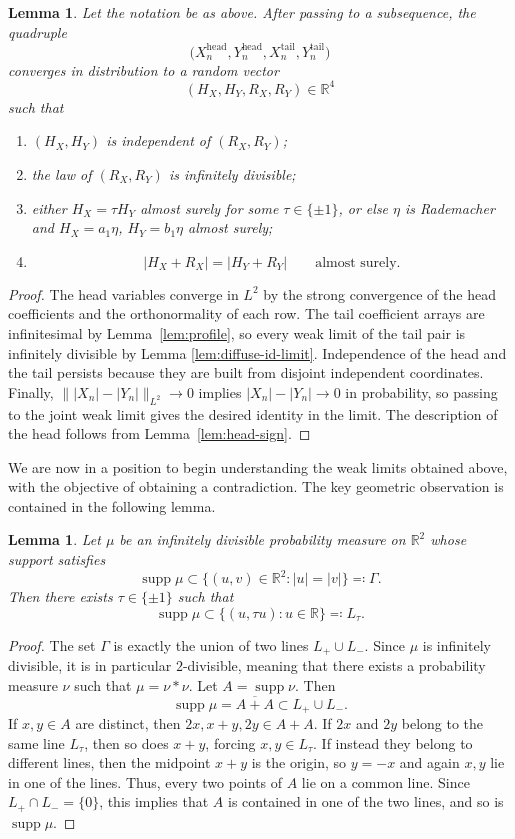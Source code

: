 \documentclass[11pt]{amsart}
\numberwithin{equation}{section}
\newtheorem{lemma}[theorem]{Lemma}
\theoremstyle{definition}
\theoremstyle{remark}
\newcommand{\R}{\mathbb R}
\newcommand{\supp}{\operatorname{supp}}
\newcommand{\abs}[1]{\lvert #1 \rvert}
\newcommand{\norm}[1]{\lVert #1 \rVert}
\begin{document}
\begin{lemma}\label{lem:limit-law}
Let the notation be as above. After passing to a subsequence, the quadruple
\[
\bigl(X_n^{\mathrm{head}},Y_n^{\mathrm{head}},
X_n^{\mathrm{tail}},Y_n^{\mathrm{tail}}\bigr)
\]
converges in distribution to a random vector
\[
(H_X,H_Y,R_X,R_Y)\in\R^4
\]
such that
\begin{enumerate}[label=\rm(\arabic*)]
\item $(H_X,H_Y)$ is independent of $(R_X,R_Y)$;
\item the law of $(R_X,R_Y)$ is infinitely divisible;
\item either $H_X=\tau H_Y$ almost surely for some $\tau\in\{\pm1\}$, or
else $\eta$ is Rademacher and
$H_X=a_1\eta$, $H_Y=b_1\eta$ almost surely;
\item
\[
\abs{H_X+R_X}=\abs{H_Y+R_Y}
\qquad\text{almost surely.}
\]
\end{enumerate}
\end{lemma}

\begin{proof}
The head variables converge in $L^2$ by the strong convergence of the head
coefficients and the orthonormality of each row.  The tail coefficient arrays
are infinitesimal by Lemma~\ref{lem:profile}, so every weak limit of the
tail pair is infinitely divisible by Lemma \ref{lem:diffuse-id-limit}.  Independence of the head and the tail persists
because they are built from disjoint independent coordinates.  Finally,
$\norm{\abs{X_n}-\abs{Y_n}}_{L^2}\to0$ implies
$\abs{X_n}-\abs{Y_n}\to0$ in probability, so passing to the joint weak limit
gives the desired identity in the limit.  The description of the head follows
from Lemma~\ref{lem:head-sign}.
\end{proof}
We are now in a position to begin understanding the weak limits obtained above, with the objective of obtaining a contradiction. The key geometric observation
is contained in the following lemma.
\begin{lemma}\label{lem:id-line}
Let $\mu$ be an infinitely divisible probability measure on $\R^2$ whose support satisfies
\[
\supp\mu\subset\{(u,v)\in\R^2:\abs{u}=\abs{v}\} \eqqcolon \Gamma.
\]
Then there exists $\tau\in\{\pm1\}$ such that
\[
\supp\mu\subset \{(u,\tau u):u\in\R\} \eqqcolon L_\tau.
\]
\end{lemma}

\begin{proof}
The set $\Gamma$ is exactly the union of two lines $L_+\cup L_-$.  Since $\mu$ is
infinitely divisible, it is in particular $2$-divisible, meaning that there exists a
probability measure $\nu$ such that $\mu=\nu*\nu$.  Let $A=\supp\nu$.  Then
\[
\supp\mu=\overline{A+A}\subset L_+\cup L_-.
\]
If $x,y\in A$ are distinct, then $2x,x+y,2y\in A+A$.  If $2x$ and $2y$ belong
to the same line $L_\tau$, then so does $x+y$, forcing $x,y\in L_\tau$.  If instead
they belong to different lines, then the midpoint $x+y$ is the origin, so
$y=-x$ and again $x,y$ lie in one of the lines.  Thus, every two points of $A$
lie on a common  line.  Since $L_+\cap L_-=\{0\}$, this implies
that $A$ is contained in one of the two lines, and so is $\supp\mu$.
\end{proof}
\end{document}
